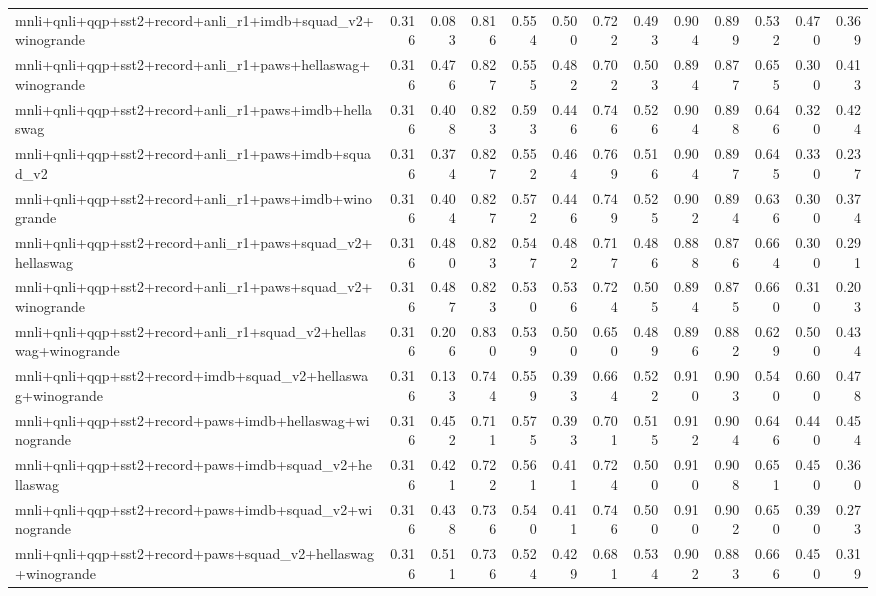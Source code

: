 \begin{table}[t]
\begin{tabular}{lrrrrrrrrrrrr}
    mnli+qnli+qqp+sst2+record+anli\_r1+imdb+squad\_v2+winogrande & 0.316 & 0.083 & 0.816 & 0.554 & 0.500 & 0.722 & 0.493 & 0.904 & 0.899 & 0.532 & 0.470 & 0.369 \\
    mnli+qnli+qqp+sst2+record+anli\_r1+paws+hellaswag+winogrande & 0.316 & 0.476 & 0.827 & 0.555 & 0.482 & 0.702 & 0.503 & 0.894 & 0.877 & 0.655 & 0.300 & 0.413 \\
    mnli+qnli+qqp+sst2+record+anli\_r1+paws+imdb+hellaswag & 0.316 & 0.408 & 0.823 & 0.593 & 0.446 & 0.746 & 0.526 & 0.904 & 0.898 & 0.646 & 0.320 & 0.424 \\
    mnli+qnli+qqp+sst2+record+anli\_r1+paws+imdb+squad\_v2 & 0.316 & 0.374 & 0.827 & 0.552 & 0.464 & 0.769 & 0.516 & 0.904 & 0.897 & 0.645 & 0.330 & 0.237 \\
    mnli+qnli+qqp+sst2+record+anli\_r1+paws+imdb+winogrande & 0.316 & 0.404 & 0.827 & 0.572 & 0.446 & 0.749 & 0.525 & 0.902 & 0.894 & 0.636 & 0.300 & 0.374 \\
    mnli+qnli+qqp+sst2+record+anli\_r1+paws+squad\_v2+hellaswag & 0.316 & 0.480 & 0.823 & 0.547 & 0.482 & 0.717 & 0.486 & 0.888 & 0.876 & 0.664 & 0.300 & 0.291 \\
    mnli+qnli+qqp+sst2+record+anli\_r1+paws+squad\_v2+winogrande & 0.316 & 0.487 & 0.823 & 0.530 & 0.536 & 0.724 & 0.505 & 0.894 & 0.875 & 0.660 & 0.310 & 0.203 \\
    mnli+qnli+qqp+sst2+record+anli\_r1+squad\_v2+hellaswag+winogrande & 0.316 & 0.206 & 0.830 & 0.539 & 0.500 & 0.650 & 0.489 & 0.896 & 0.882 & 0.629 & 0.500 & 0.434 \\
    mnli+qnli+qqp+sst2+record+imdb+squad\_v2+hellaswag+winogrande & 0.316 & 0.133 & 0.744 & 0.559 & 0.393 & 0.664 & 0.522 & 0.910 & 0.903 & 0.540 & 0.600 & 0.478 \\
    mnli+qnli+qqp+sst2+record+paws+imdb+hellaswag+winogrande & 0.316 & 0.452 & 0.711 & 0.575 & 0.393 & 0.701 & 0.515 & 0.912 & 0.904 & 0.646 & 0.440 & 0.454 \\
    mnli+qnli+qqp+sst2+record+paws+imdb+squad\_v2+hellaswag & 0.316 & 0.421 & 0.722 & 0.561 & 0.411 & 0.724 & 0.500 & 0.910 & 0.908 & 0.651 & 0.450 & 0.360 \\
    mnli+qnli+qqp+sst2+record+paws+imdb+squad\_v2+winogrande & 0.316 & 0.438 & 0.736 & 0.540 & 0.411 & 0.746 & 0.500 & 0.910 & 0.902 & 0.650 & 0.390 & 0.273 \\
    mnli+qnli+qqp+sst2+record+paws+squad\_v2+hellaswag+winogrande & 0.316 & 0.511 & 0.736 & 0.524 & 0.429 & 0.681 & 0.534 & 0.902 & 0.883 & 0.666 & 0.450 & 0.319 \\

\end{tabular}
\end{table}
